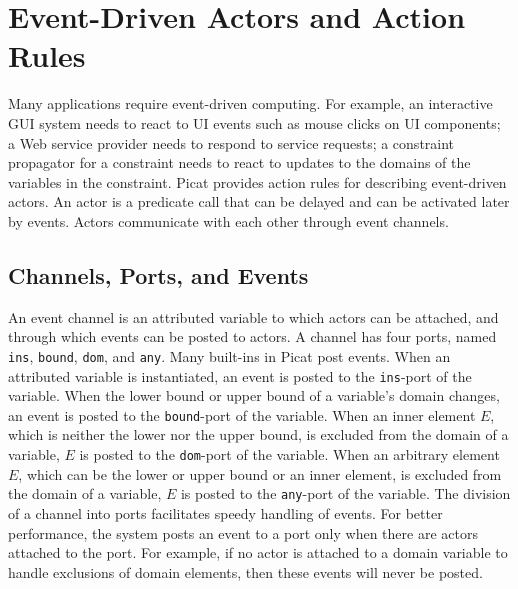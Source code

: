 \chapter{\label{ch:actors}Event-Driven Actors and Action Rules}
Many applications require event-driven computing. For example, an interactive GUI system needs to react to UI events such as mouse clicks on UI components; a Web service provider needs to respond to service requests; a constraint propagator for a constraint needs to react to updates to the domains of the variables in the constraint. Picat provides action rules for describing event-driven actors. An actor is a predicate call that can be delayed and can be activated later by events. Actors communicate with each other through event channels. 

\section{Channels, Ports, and Events}
An event channel is an attributed variable to which actors can be attached, and through which events can be posted to actors. A channel has four ports, named \texttt{ins}, \texttt{bound}, \texttt{dom}, and \texttt{any}. Many built-ins in Picat post events. When an attributed variable is instantiated, an event is posted to the \texttt{ins}-port of the variable. When the lower bound or upper bound of a variable's domain changes, an event  is posted to the \texttt{bound}-port of the variable. When an inner element $E$, which is neither the lower nor the upper bound, is excluded from the domain of a variable, $E$ is posted to the \texttt{dom}-port of the variable. When an arbitrary element $E$, which can be the lower or upper bound or an inner element, is excluded from the domain of a variable, $E$ is posted to the \texttt{any}-port of the variable. The division of a channel into ports facilitates speedy handling of events. For better performance, the system posts an event to a port only when there are actors attached to the port. For example, if no actor is attached to a domain variable to handle exclusions of domain elements, then these events will never be posted.

